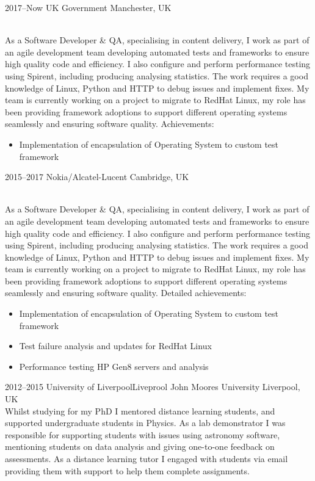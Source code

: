 \documentclass[]{cv-style}          %
\begin{document}
\begin{entrylist}
\entry
  {2017--Now}
  {UK Government}
  {Manchester, UK}
  {\\
As a Software Developer \& QA, specialising in content delivery, I work as part of an agile development team developing automated tests and frameworks to ensure high quality code and efficiency. I also configure and perform performance testing using Spirent, including producing analysing statistics. The work requires a good knowledge of Linux, Python and HTTP to debug issues and implement fixes. My team is currently working on a project to migrate to RedHat Linux, my role has been providing framework adoptions to support different operating systems seamlessly and ensuring software quality.
Achievements:
\begin{itemize}
  \item Implementation of encapsulation of Operating System to custom test framework
\end{itemize}
}
\entry
  {2015--2017}
  {Nokia/Alcatel-Lucent}
  {Cambridge, UK}
  {\\
As a Software Developer \& QA, specialising in content delivery, I work as part of an agile development team developing automated tests and frameworks to ensure high quality code and efficiency. I also configure and perform performance testing using Spirent, including producing analysing statistics. The work requires a good knowledge of Linux, Python and HTTP to debug issues and implement fixes. My team is currently working on a project to migrate to RedHat Linux, my role has been providing framework adoptions to support different operating systems seamlessly and ensuring software quality.
Detailed achievements:
\begin{itemize}
  \item Implementation of encapsulation of Operating System to custom test framework
  \item Test failure analysis and updates for RedHat Linux
  \item Performance testing HP Gen8 servers and analysis
\end{itemize}
}
\entry
  {2012--2015}
  {University of Liverpool\/Liveprool John Moores University}
  {Liverpool, UK}
  {\\
  Whilst studying for my PhD I mentored distance learning students, and supported undergraduate students in Physics. As a lab demonstrator I was responsible for supporting students with issues using astronomy software, mentioning students on data analysis and giving one-to-one feedback on assessments.  As a distance learning tutor I engaged with students via email providing them with support to help them complete assignments.\\
  }
\end{entrylist}
\end{document}
